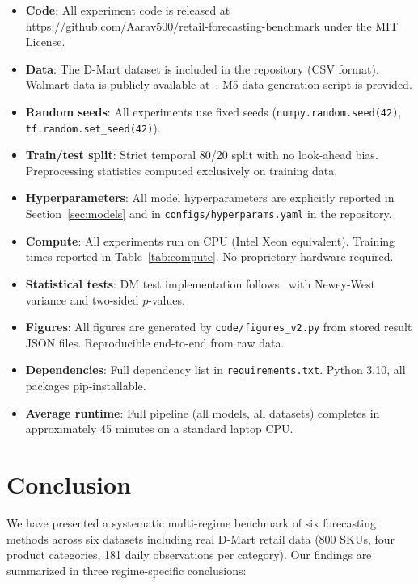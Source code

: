 \documentclass[journal]{IEEEtran}
\begin{document}
\begin{itemize}
  \item[\checkmark] \textbf{Code}: All experiment code is released at \url{https://github.com/Aarav500/retail-forecasting-benchmark} under the MIT License.
  \item[\checkmark] \textbf{Data}: The D-Mart dataset is included in the repository (CSV format). Walmart data is publicly available at~\cite{walmart_kaggle}. M5 data generation script is provided.
  \item[\checkmark] \textbf{Random seeds}: All experiments use fixed seeds (\texttt{numpy.random.seed(42)}, \texttt{tf.random.set\_seed(42)}).
  \item[\checkmark] \textbf{Train/test split}: Strict temporal 80/20 split with no look-ahead bias. Preprocessing statistics computed exclusively on training data.
  \item[\checkmark] \textbf{Hyperparameters}: All model hyperparameters are explicitly reported in Section~\ref{sec:models} and in \texttt{configs/hyperparams.yaml} in the repository.
  \item[\checkmark] \textbf{Compute}: All experiments run on CPU (Intel Xeon equivalent). Training times reported in Table~\ref{tab:compute}. No proprietary hardware required.
  \item[\checkmark] \textbf{Statistical tests}: DM test implementation follows~\cite{diebold1995comparing} with Newey-West variance and two-sided $p$-values.
  \item[\checkmark] \textbf{Figures}: All figures are generated by \texttt{code/figures\_v2.py} from stored result JSON files. Reproducible end-to-end from raw data.
  \item[\checkmark] \textbf{Dependencies}: Full dependency list in \texttt{requirements.txt}. Python 3.10, all packages pip-installable.
  \item[\checkmark] \textbf{Average runtime}: Full pipeline (all models, all datasets) completes in approximately 45 minutes on a standard laptop CPU.
\end{itemize}

\section{Conclusion}
\label{sec:conclusion}

We have presented a systematic multi-regime benchmark of six forecasting methods across six datasets including real D-Mart retail data (800 SKUs, four product categories, 181 daily observations per category). Our findings are summarized in three regime-specific conclusions:
\end{document}
